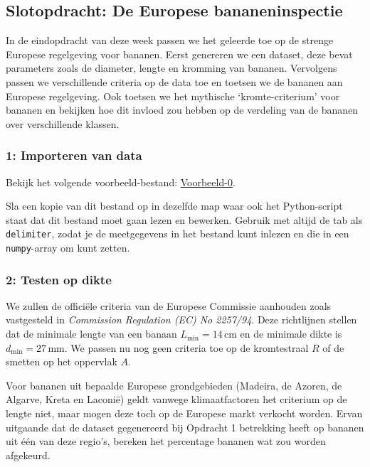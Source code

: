 \documentclass[a4paper,11pt, fleqn]{article}
\begin{document}

\subsection{Slotopdracht: De Europese bananeninspectie}
In de eindopdracht van deze week passen we het geleerde toe op de strenge Europese regelgeving voor bananen. Eerst genereren we een dataset, deze bevat parameters zoals de diameter, lengte en kromming van bananen. Vervolgens passen we verschillende criteria op de data toe en toetsen we de bananen aan Europese regelgeving. Ook toetsen we het mythische `kromte-criterium' voor bananen en bekijken hoe dit invloed zou hebben op de verdeling van de bananen over verschillende klassen.

\subsubsection*{1: Importeren van data}
Bekijk het volgende voorbeeld-bestand: 
\href{http://nspracticum.science.uu.nl/DATA2020/DATA-Py/Databestanden/vb1.txt}{Voorbeeld-0}.

Sla een kopie van dit bestand op in dezelfde map waar ook het Python-script staat dat dit bestand moet gaan lezen en bewerken.
Gebruik  met altijd de tab als \verb,delimiter,, zodat je de meetgegevens in het bestand kunt inlezen en die in een \verb,numpy,-array om kunt zetten.

\subsubsection*{2: Testen op dikte}
We zullen de offici\"ele criteria van de Europese Commissie aanhouden zoals vastgesteld in \emph{Commission Regulation (EC) No 2257/94}. Deze richtlijnen stellen dat de minimale lengte van een banaan $L_\textrm{min} = 14\,\textrm{cm}$ en de minimale dikte is $d_\textrm{min} = 27\,\textrm{mm}$. We passen nu nog geen criteria toe op de kromtestraal $R$ of de smetten op het oppervlak $A$.

Voor bananen uit bepaalde Europese grondgebieden (Madeira, de Azoren, de Algarve, Kreta en Laconi\"e) geldt vanwege klimaatfactoren het criterium op de lengte niet, maar mogen deze toch op de Europese markt verkocht worden. Ervan uitgaande dat de dataset gegenereerd bij Opdracht 1 betrekking heeft op bananen uit \'e\'en van deze regio's, bereken het percentage bananen wat zou worden afgekeurd.
\end{document}
